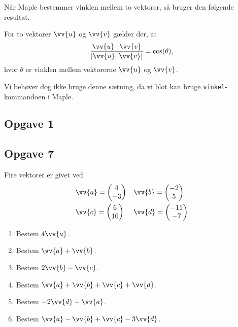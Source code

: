 Når Maple bestemmer vinklen mellem to vektorer, så bruger den følgende resultat.
\begin{setn}
	For to vektorer $\vv{u}$ og $\vv{v}$ gælder der, at 
	\begin{align*}
		\frac{\vv{u}\cdot \vv{v}}{|\vv{u}||\vv{v}|} = \cos(\theta),
	\end{align*}
	hvor $\theta$ er vinklen mellem vektorerne $\vv{u}$ og $\vv{v}$.
\end{setn}
Vi behøver dog ikke bruge denne sætning, da vi blot kan bruge \texttt{vinkel}-kommandoen i Maple.


\subsection*{Opgave 1}


\subsection*{Opgave 7}
Fire vektorer er givet ved
\begin{align*}
	&\vv{a} = 
	\begin{pmatrix}
		4 \\ -3
	\end{pmatrix} 
	&
	&\vv{b} = 
	\begin{pmatrix}
		-2 \\ 5
	\end{pmatrix}
	\\
	&\vv{c} = 
	\begin{pmatrix}
		6 \\ 10
	\end{pmatrix}
	&
	&\vv{d} = 
	\begin{pmatrix}
		-11 \\ -7
	\end{pmatrix}
\end{align*}

\begin{enumerate}[label=\roman*)]
	\item Bestem $4\vv{a}$.
	\item Bestem $\vv{a} + \vv{b}$.
	\item Bestem $2\vv{b} - \vv{c}$.
	\item Bestem $\vv{a}+\vv{b}+\vv{c}+\vv{d}$.
	\item Bestem $-2\vv{d} - \vv{a}$.
	\item Bestem $\vv{a}-\vv{b}+\vv{c}-3\vv{d}$.
\end{enumerate}

